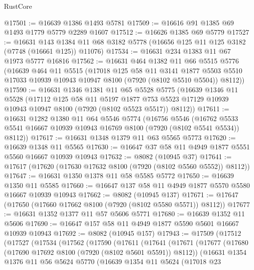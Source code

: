 \begin{lexlean}{RustCore}
\begin{coremodule}
@17501 := @16639 @1386 @1493 @5781
@17509 := @16616 @91 @1385 @69 @1493 @1779 @5779 @2289 @1607
@17512 := @16626 @1385 @69 @5779
@17527 := @16631
    @143
    @1384
    @11
    @68
    @3182
    @5778
    (@16656 @125 @11 @125 @3182 (@7748 (@16661 @125)) @11076)
@17534 := @16631 @234 @1383 @11 @67 @1973 @5777 @16816
@17562 := @16631
    @464
    @1382
    @11
    @66
    @5515
    @5776
    (@16639
      @464
      @11
      @5515
      (@17018
        @125
        @58
        @11
        @3141
        @1877
        @5503
        @5510
        @17033
        @10939
        @10943
        @10947
        @8100
        (@7920 (@8102 @5510 @5504))
        @8112))
@17590 := @16631
    @1346
    @1381
    @11
    @65
    @5528
    @5775
    (@16639
      @1346
      @11
      @5528
      (@17112
        @125
        @58
        @11
        @5197
        @1877
        @753
        @5523
        @17129
        @10939
        @10943
        @10947
        @8100
        (@7920 (@8102 @5523 @5517))
        @8112))
@17611 := @16631
    @1282
    @1380
    @11
    @64
    @5546
    @5774
    (@16756
      @5546
      (@16762 @5533 @5541 @16667 @10939 @10943 @16769 @8100 (@7920 (@8102 @5541 @5534)) @8112))
@17617 := @16631 @1348 @1379 @11 @63 @5565 @5773
@17620 := @16639 @1348 @11 @5565
@17630 := @16647 @37 @58 @11 @4949 @1877 @5551 @5560 @16667 @10939 @10943
@17632 := @8082 (@10945 @37)
@17641 := @17617 (@17620 (@17630 @17632 @8100 (@7920 (@8102 @5560 @5552)) @8112))
@17647 := @16631 @1350 @1378 @11 @58 @5585 @5772
@17650 := @16639 @1350 @11 @5585
@17660 := @16647 @137 @58 @11 @4949 @1877 @5570 @5580 @16667 @10939 @10943
@17662 := @8082 (@10945 @137)
@17671 := @17647 (@17650 (@17660 @17662 @8100 (@7920 (@8102 @5580 @5571)) @8112))
@17677 := @16631 @1352 @1377 @11 @57 @5606 @5771
@17680 := @16639 @1352 @11 @5606
@17690 := @16647 @157 @58 @11 @4949 @1877 @5590 @5601 @16667 @10939 @10943
@17692 := @8082 (@10945 @157)
@17943 := @17509
    (@17512
      (@17527
        (@17534
          (@17562
            (@17590
              (@17611
                (@17641
                  (@17671
                    (@17677
                      (@17680 (@17690 @17692 @8100 (@7920 (@8102 @5601 @5591)) @8112))
                      (@16631
                        @1354
                        @1376
                        @11
                        @56
                        @5624
                        @5770
                        (@16639
                          @1354
                          @11
                          @5624
                          (@17018
                            @23

\end{coremodule}
\end{lexlean}

